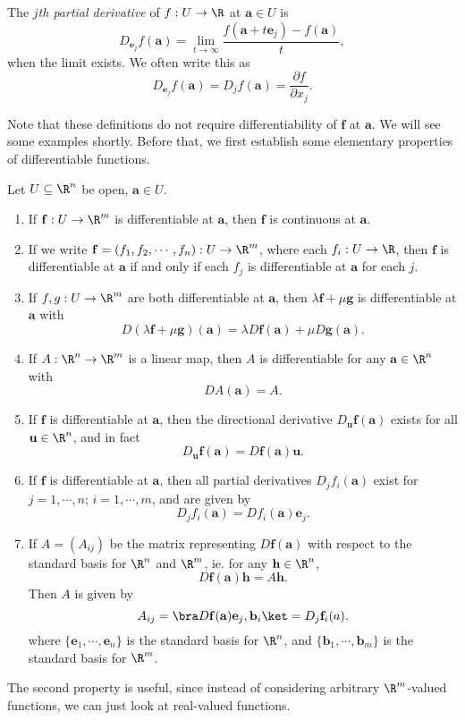 \documentclass[a4paper]{article}
\begin{document}
\begin{defi}
  The \emph{$j$th partial derivative} of $f: U \to \R$ at $\mathbf{a} \in U$ is
  \[
    D_{\mathbf{e}_j} f(\mathbf{a}) = \lim_{t \to \infty} \frac{f(\mathbf{a} + t \mathbf{e}_j) - f(\mathbf{a})}{t},
  \]
  when the limit exists. We often write this as
  \[
    D_{\mathbf{e}_j} f(\mathbf{a}) = D_j f(\mathbf{a}) = \frac{\partial f}{\partial x_j}.
  \]
\end{defi}
Note that these definitions do not require differentiability of $\mathbf{f}$ at $\mathbf{a}$. We will see some examples shortly. Before that, we first establish some elementary properties of differentiable functions.
\begin{prop}
  Let $U \subseteq \R^n$ be open, $\mathbf{a} \in U$.
  \begin{enumerate}
    \item If $\mathbf{f}: U \to \R^m$ is differentiable at $\mathbf{a}$, then $\mathbf{f}$ is continuous at $\mathbf{a}$.
    \item If we write $\mathbf{f} = (f_1, f_2, \cdots, f_n): U \to \R^m$, where each $f_i: U \to \R$, then $\mathbf{f}$ is differentiable at $\mathbf{a}$ if and only if each $f_j$ is differentiable at $\mathbf{a}$ for each $j$.
    \item If $f, g: U \to \R^m$ are both differentiable at $\mathbf{a}$, then $\lambda \mathbf{f} + \mu \mathbf{g}$ is differentiable at $\mathbf{a}$ with
      \[
        D( \lambda \mathbf{f} + \mu \mathbf{g})(\mathbf{a}) = \lambda D \mathbf{f}(\mathbf{a}) + \mu D \mathbf{g}(\mathbf{a}).
      \]
    \item If $A: \R^n \to \R^m$ is a linear map, then $A$ is differentiable for any $\mathbf{a} \in \R^n$ with
      \[
        D A(\mathbf{a}) = A.
      \]
    \item If $\mathbf{f}$ is differentiable at $\mathbf{a}$, then the directional derivative $D_\mathbf{u} \mathbf{f}(\mathbf{a})$ exists for all $\mathbf{u} \in \R^n$, and in fact
      \[
        D_{\mathbf{u}} \mathbf{f}(\mathbf{a}) = D \mathbf{f}(\mathbf{a}) \mathbf{u}.
      \]
    \item If $\mathbf{f}$ is differentiable at $\mathbf{a}$, then all partial derivatives $D_j f_i(\mathbf{a})$ exist for $j = 1, \cdots, n$; $i = 1, \cdots, m$, and are given by
      \[
        D_j f_i(\mathbf{a}) = D f_i(\mathbf{a}) \mathbf{e}_j.
      \]
    \item If $A = (A_{ij})$ be the matrix representing $D \mathbf{f}(\mathbf{a})$ with respect to the standard basis for $\R^n$ and $\R^m$, ie. for any $\mathbf{h} \in \R^n$,
      \[
        D \mathbf{f}(\mathbf{a}) \mathbf{h} = A \mathbf{h}.
      \]
      Then $A$ is given by
      \[
        A_{ij} = \bra D \mathbf{f}(\mathbf{a}) \mathbf{e}_j, \mathbf{b}_i\ket = D_j \mathbf{f}_i (a).
      \]
      where $\{\mathbf{e}_1, \cdots, \mathbf{e}_n\}$ is the standard basis for $\R^n$, and $\{\mathbf{b}_1, \cdots, \mathbf{b}_m\}$ is the standard basis for $\R^m$.
  \end{enumerate}
\end{prop}
The second property is useful, since instead of considering arbitrary $\R^m$-valued functions, we can just look at real-valued functions.
\end{document}
